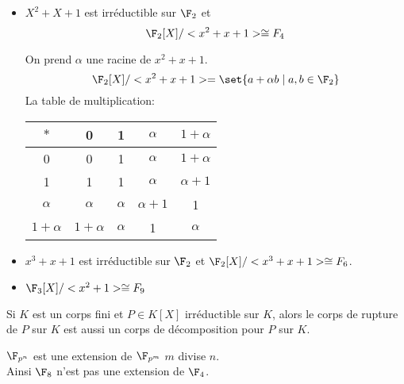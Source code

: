 \begin{example}

	\begin{itemize}
		\item $X^2+X+1$ est irréductible sur $\F_2$ et
		      $$\F_2[X]/ <x^2+x+1> \cong F_4$$

		      On prend $\alpha$ une racine de $x^2+x+1$.
		      $$\F_2[X]/ <x^2+x+1> = \set{ a + \alpha b \mid a,b \in \F_2}$$
		      La table de multiplication:

		      \begin{center} %
			      \begin{tabular}{c|c|c|c|c}
				      $*$        & 0          & 1        & $\alpha$    & $1+\alpha$  \\
				      \hline
				      0          & 0          & 1        & $\alpha$    & $1+\alpha$  \\
				      \hline
				      1          & 1          & 1        & $\alpha$    & $\alpha +1$ \\
				      \hline
				      $\alpha$   & $\alpha$   & $\alpha$ & $\alpha +1$ & 1           \\
				      \hline
				      $1+\alpha$ & $1+\alpha$ & $\alpha$ & 1           & $\alpha$    \\
			      \end{tabular}
		      \end{center}
		\item$x^3+x+1$ est irréductible sur $\F_2$ et $\F_2[X]/ <x^3+x+1> \cong F_6$.
		\item$ \F_3[X]/ <x^2+1> \cong F_9$
	\end{itemize}
\end{example}


\begin{exercice}
	Si $K$ est un corps fini et $P \in K[X]$ irréductible sur $K$, alors le
	corps de rupture de $P$ sur $K$ est aussi un corps de décomposition pour $P$ sur $K$.
\end{exercice}

\begin{remarque}
	$\F_{p^n}$ est une extension de $\F_{p^m}$ \ssi $m$ divise $n$.\\
	Ainsi $\F_8$ n'est pas une extension de $\F_4$. \\
\end{remarque}





